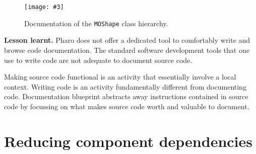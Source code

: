 \documentclass[runningheads]{llncs}
\newcommand{\ct}{\lstinline[backgroundcolor=\color{white},basicstyle=\footnotesize\ttfamily]}
\newcommand{\largefig}[4]{
	\begin{figure*}[#1]
		\centering
		\texttt{[image: \#3]}
		\caption{\label{fig:#3}#4}
	\end{figure*}}
\newcommand{\seclabel}[1]{\label{sec:#1}}
\newcommand{\figref}[1]{Figure~\ref{fig:#1}}
\newcommand{\tablabel}[1]{\label{tab:#1}}
\newcommand{\myparagraph}[1]{\noindent \textbf{#1.}}
\begin{document}
%
%

\largefig{}{1.0}{DocumentationBlueprintEvolution}{Documentation of the \ct{MOShape} class hierarchy.}

\myparagraph{Lesson learnt}
Pharo does not offer a dedicated tool to comfortably write and browse code documentation. The standard software development tools that one use to write code are not adequate to document source code. 

Making source code functional is an activity that essentially involve a local context. Writing code is an activity fundamentally different from documenting code. Documentation blueprint abstracts away instructions contained in source code by focussing on what makes source code worth and valuable to document.

\section{Reducing component dependencies}\seclabel{dependencyblueprint}
\end{document}
